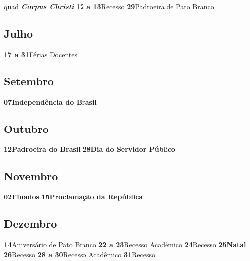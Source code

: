 \documentclass[thesis]{hmcposter}
\begin{document}
\begin{poster}
quad \quad \textbf{\textit{Corpus Christi}} \newline\textbf{12 a 13}\quad \quad Recesso \newline\textbf{29}\quad \quad \quad \quad Padroeira de Pato Branco \newline\subsection{Julho}\textbf{17 a 31}\quad \quad Férias Docentes \newline\subsection{Setembro}\textbf{07}\quad \quad \quad \quad \textbf{Independência do Brasil} \newline\subsection{Outubro}\textbf{12}\quad \quad \quad \quad \textbf{Padroeira do Brasil} \newline\textbf{28}\quad \quad \quad \quad \textbf{Dia do Servidor Público} \newline\subsection{Novembro}\textbf{02}\quad \quad \quad \quad \textbf{Finados} \newline\textbf{15}\quad \quad \quad \quad \textbf{Proclamação da República} \newline\subsection{Dezembro}\textbf{14}\quad \quad \quad \quad Aniversário de Pato Branco \newline\textbf{22 a 23}\quad \quad Recesso Acadêmico \newline\textbf{24}\quad \quad \quad \quad Recesso \newline\textbf{25}\quad \quad \quad \quad \textbf{Natal} \newline\textbf{26}\quad \quad \quad \quad Recesso \newline\textbf{28 a 30}\quad \quad Recesso Acadêmico \newline\textbf{31}\quad \quad \quad \quad Recesso \newline\newpage

\end{poster}
\end{document}

